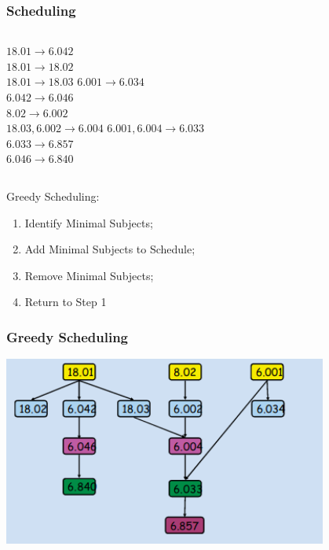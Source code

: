 \documentclass{beamer}
\begin{document}
\begin{frame}
  \frametitle{Scheduling}

  \begin{columns}[T]
    $18.01 \rightarrow 6.042$\\
    $18.01 \rightarrow 18.02$\\
    $18.01 \rightarrow 18.03$
    $6.001 \rightarrow 6.034$\\
    $6.042 \rightarrow 6.046$\\
    $8.02 \rightarrow 6.002$\\
    $18.03, 6.002 \rightarrow 6.004$
    $6.001, 6.004 \rightarrow 6.033$\\
    $6.033 \rightarrow 6.857$\\
    $6.046 \rightarrow 6.840$
  \end{columns}

  \vfill

  {\larger
    Greedy Scheduling:
    \begin{enumerate}
    \item Identify Minimal Subjects;
    \item Add Minimal Subjects to Schedule;
    \item Remove Minimal Subjects;
    \item Return to Step 1
    \end{enumerate}
  }
\end{frame}

\begin{frame}
  \frametitle{Greedy Scheduling}
  \begin{center}
    \includegraphics[width=0.8\textwidth]{../img/greedy_schedule}
  \end{center}
\end{frame}
\end{document}
